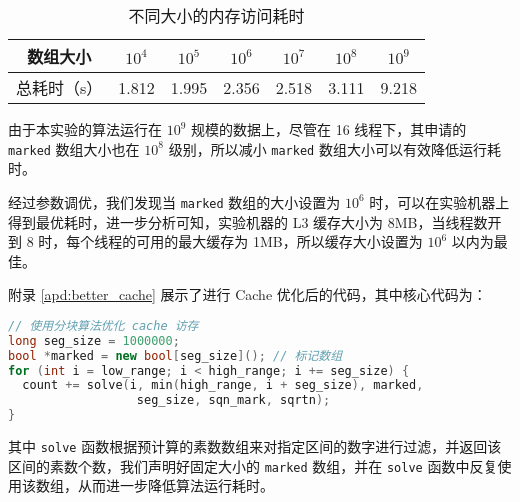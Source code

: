 \documentclass[11pt]{article}
\begin{document}
  \begin{table}[h]
    \centering
    \caption{不同大小的内存访问耗时}
    \label{tab:mem}
    \begin{tabular}{ccccccc}
      \hline
      数组大小 & $10^4$ & $10^5$ & $10^6$ & $10^7$ & $10^8$ & $10^9$ \\
      \hline
      总耗时（s） & 1.812 & 1.995 & 2.356 & 2.518 & 3.111 & 9.218 \\
      \hline
    \end{tabular}
  \end{table}

  由于本实验的算法运行在 $10^9$ 规模的数据上，尽管在 16 线程下，其申请的 \verb|marked| 数组大小也在 $10^8$ 级别，所以减小 \verb|marked| 数组大小可以有效降低运行耗时。

  经过参数调优，我们发现当 \verb|marked| 数组的大小设置为 $10^6$ 时，可以在实验机器上得到最优耗时，进一步分析可知，实验机器的 L3 缓存大小为 8MB，当线程数开到 8 时，每个线程的可用的最大缓存为 1MB，所以缓存大小设置为 $10^6$ 以内为最佳。

  附录 \ref{apd:better_cache} 展示了进行 Cache 优化后的代码，其中核心代码为：

  \begin{file}
    \begin{lstlisting}[language=C++]
// 使用分块算法优化 cache 访存
long seg_size = 1000000;
bool *marked = new bool[seg_size](); // 标记数组
for (int i = low_range; i < high_range; i += seg_size) {
  count += solve(i, min(high_range, i + seg_size), marked,
                  seg_size, sqn_mark, sqrtn);
}
  \end{lstlisting}
  \end{file}

  其中 \verb|solve| 函数根据预计算的素数数组来对指定区间的数字进行过滤，并返回该区间的素数个数，我们声明好固定大小的 \verb|marked| 数组，并在 \verb|solve| 函数中反复使用该数组，从而进一步降低算法运行耗时。
\end{document}
